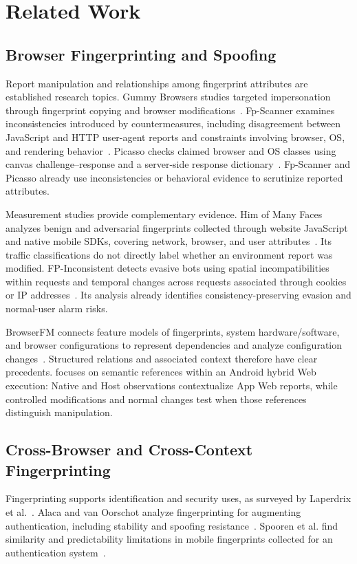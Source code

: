\section{Related Work}
\subsection{Browser Fingerprinting and Spoofing}
Report manipulation and relationships among fingerprint attributes are established research topics. Gummy Browsers studies targeted impersonation through fingerprint copying and browser modifications~\cite{liu2022gummy}. Fp-Scanner examines inconsistencies introduced by countermeasures, including disagreement between JavaScript and HTTP user-agent reports and constraints involving browser, OS, and rendering behavior~\cite{vastel2018fpscanner}. Picasso checks claimed browser and OS classes using canvas challenge--response and a server-side response dictionary~\cite{bursztein2016picasso}. Fp-Scanner and Picasso already use inconsistencies or behavioral evidence to scrutinize reported attributes.

Measurement studies provide complementary evidence. Him of Many Faces analyzes benign and adversarial fingerprints collected through website JavaScript and native mobile SDKs, covering network, browser, and user attributes~\cite{wu2023manyfaces}. Its traffic classifications do not directly label whether an environment report was modified. FP-Inconsistent detects evasive bots using spatial incompatibilities within requests and temporal changes across requests associated through cookies or IP addresses~\cite{venugopalan2025fpinconsistent}. Its analysis already identifies consistency-preserving evasion and normal-user alarm risks.

BrowserFM connects feature models of fingerprints, system hardware/software, and browser configurations to represent dependencies and analyze configuration changes~\cite{huyghe2025browserfm}. Structured relations and associated context therefore have clear precedents. \hg focuses on semantic references within an Android hybrid Web execution: Native and Host observations contextualize App Web reports, while controlled modifications and normal changes test when those references distinguish manipulation.

\subsection{Cross-Browser and Cross-Context Fingerprinting}
Fingerprinting supports identification and security uses, as surveyed by Laperdrix et al.~\cite{laperdrix2020browser}. Alaca and van Oorschot analyze fingerprinting for augmenting authentication, including stability and spoofing resistance~\cite{alaca2016device}. Spooren et al. find similarity and predictability limitations in mobile fingerprints collected for an authentication system~\cite{spooren2015harmful}.


